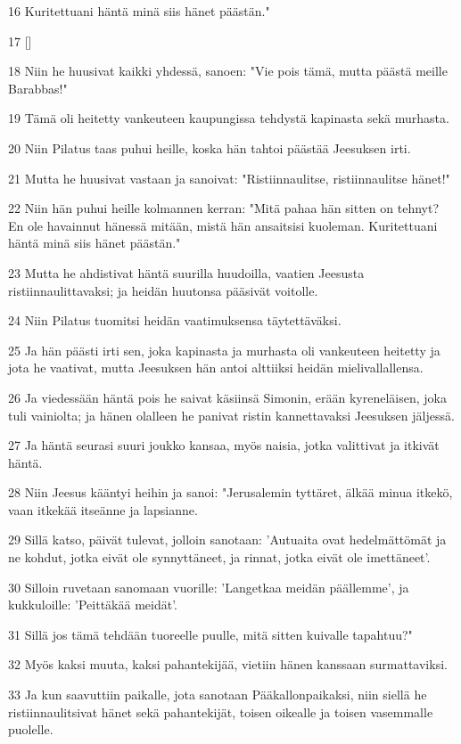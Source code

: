 \par 16 Kuritettuani häntä minä siis hänet päästän."
\par 17 []
\par 18 Niin he huusivat kaikki yhdessä, sanoen: "Vie pois tämä, mutta päästä meille Barabbas!"
\par 19 Tämä oli heitetty vankeuteen kaupungissa tehdystä kapinasta sekä murhasta.
\par 20 Niin Pilatus taas puhui heille, koska hän tahtoi päästää Jeesuksen irti.
\par 21 Mutta he huusivat vastaan ja sanoivat: "Ristiinnaulitse, ristiinnaulitse hänet!"
\par 22 Niin hän puhui heille kolmannen kerran: "Mitä pahaa hän sitten on tehnyt? En ole havainnut hänessä mitään, mistä hän ansaitsisi kuoleman. Kuritettuani häntä minä siis hänet päästän."
\par 23 Mutta he ahdistivat häntä suurilla huudoilla, vaatien Jeesusta ristiinnaulittavaksi; ja heidän huutonsa pääsivät voitolle.
\par 24 Niin Pilatus tuomitsi heidän vaatimuksensa täytettäväksi.
\par 25 Ja hän päästi irti sen, joka kapinasta ja murhasta oli vankeuteen heitetty ja jota he vaativat, mutta Jeesuksen hän antoi alttiiksi heidän mielivallallensa.
\par 26 Ja viedessään häntä pois he saivat käsiinsä Simonin, erään kyreneläisen, joka tuli vainiolta; ja hänen olalleen he panivat ristin kannettavaksi Jeesuksen jäljessä.
\par 27 Ja häntä seurasi suuri joukko kansaa, myös naisia, jotka valittivat ja itkivät häntä.
\par 28 Niin Jeesus kääntyi heihin ja sanoi: "Jerusalemin tyttäret, älkää minua itkekö, vaan itkekää itseänne ja lapsianne.
\par 29 Sillä katso, päivät tulevat, jolloin sanotaan: 'Autuaita ovat hedelmättömät ja ne kohdut, jotka eivät ole synnyttäneet, ja rinnat, jotka eivät ole imettäneet'.
\par 30 Silloin ruvetaan sanomaan vuorille: 'Langetkaa meidän päällemme', ja kukkuloille: 'Peittäkää meidät'.
\par 31 Sillä jos tämä tehdään tuoreelle puulle, mitä sitten kuivalle tapahtuu?"
\par 32 Myös kaksi muuta, kaksi pahantekijää, vietiin hänen kanssaan surmattaviksi.
\par 33 Ja kun saavuttiin paikalle, jota sanotaan Pääkallonpaikaksi, niin siellä he ristiinnaulitsivat hänet sekä pahantekijät, toisen oikealle ja toisen vasemmalle puolelle.
